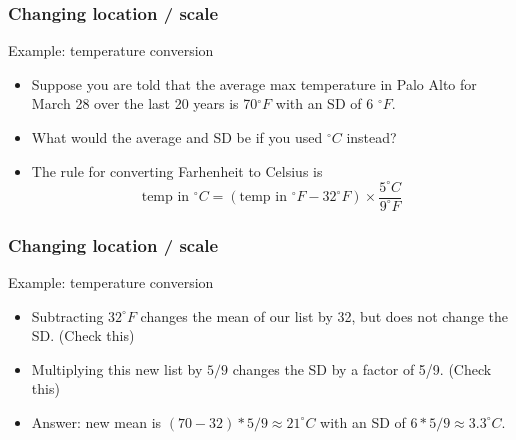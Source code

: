 \documentclass[handout]{beamer}
\begin{document}
   \begin{frame} \frametitle{Changing location / scale}

   \begin{block}
   {Example: temperature conversion}
   \begin{itemize}
   \item    Suppose you are told that the average max temperature in
   Palo Alto
   for March 28 over the last 20 years is 70$^{\circ} F$ with an SD
   of 6 $^{\circ} F$.
   \item What would the average and SD be if you
   used $^{\circ} C$ instead?
   \item The rule for converting Farhenheit to Celsius is
   $$ \text{temp in $^{\circ} C$} = (\text{temp in $^{\circ} F$} - 32^{\circ} F) \times \frac{5^{\circ} C}{9^{\circ} F}
   $$
   \end{itemize}
   \end{block}
   \end{frame}


   \begin{frame} \frametitle{Changing location / scale}

   \begin{block}
   {Example: temperature conversion}
   \begin{itemize}
   \item Subtracting $32 ^{\circ} F$ changes the mean of our list by 32, but
   does not change the SD. ({\sc Check this})
   \item Multiplying this new list by $5/9$ changes the SD by a factor of 5/9.
   ({\sc Check this})
   \item Answer: new mean is $(70-32)*5/9\approx 21^{\circ} C$ with an
   SD of $6*5/9 \approx 3.3 ^{\circ} C$.
   \end{itemize}
   \end{block}
   \end{frame}


   \begin{frame} 

   \end{frame}

   
\end{document}
